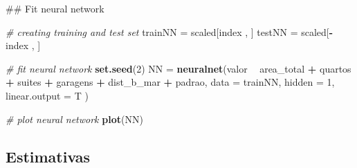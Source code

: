 \documentclass[a4paper, 12pt]{article}
\newenvironment{Shaded}{\begin{snugshade}}{\end{snugshade}}
\newcommand{\KeywordTok}[1]{\textcolor[rgb]{0.13,0.29,0.53}{\textbf{#1}}}
\newcommand{\DataTypeTok}[1]{\textcolor[rgb]{0.13,0.29,0.53}{#1}}
\newcommand{\DecValTok}[1]{\textcolor[rgb]{0.00,0.00,0.81}{#1}}
\newcommand{\StringTok}[1]{\textcolor[rgb]{0.31,0.60,0.02}{#1}}
\newcommand{\CommentTok}[1]{\textcolor[rgb]{0.56,0.35,0.01}{\textit{#1}}}
\newcommand{\OperatorTok}[1]{\textcolor[rgb]{0.81,0.36,0.00}{\textbf{#1}}}
\newcommand{\NormalTok}[1]{#1}
\begin{document}
\begin{Shaded}
\begin{Highlighting}[]
\NormalTok{## Fit neural network }

\CommentTok{# creating training and test set}
\NormalTok{trainNN =}\StringTok{ }\NormalTok{scaled[index , ]}
\NormalTok{testNN =}\StringTok{ }\NormalTok{scaled[}\OperatorTok{-}\NormalTok{index , ]}

\CommentTok{# fit neural network}
\KeywordTok{set.seed}\NormalTok{(}\DecValTok{2}\NormalTok{)}
\NormalTok{NN =}\StringTok{ }\KeywordTok{neuralnet}\NormalTok{(valor }\OperatorTok{~}\StringTok{ }\NormalTok{area_total }\OperatorTok{+}\StringTok{ }\NormalTok{quartos }\OperatorTok{+}\StringTok{ }\NormalTok{suites }\OperatorTok{+}\StringTok{ }\NormalTok{garagens }\OperatorTok{+}\StringTok{ }
\StringTok{                 }\NormalTok{dist_b_mar }\OperatorTok{+}\StringTok{ }\NormalTok{padrao, }
               \DataTypeTok{data =}\NormalTok{ trainNN, }\DataTypeTok{hidden =} \DecValTok{1}\NormalTok{, }\DataTypeTok{linear.output =}\NormalTok{ T )}

\CommentTok{# plot neural network}
\KeywordTok{plot}\NormalTok{(NN)}
\end{Highlighting}
\end{Shaded}

\subsection{Estimativas}\label{estimativas}

\begin{Shaded}
\end{Shaded}
\end{document}
